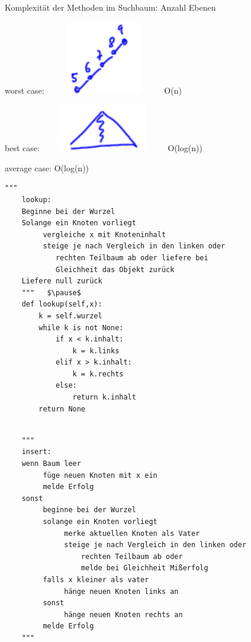 \documentclass{beamer}
\begin{document}
\begin{frame}[fragile]
Komplexität der Methoden im Suchbaum: Anzahl Ebenen  

worst case: ~~~~  
\includegraphics[scale=0.6]{suchbaum6.png}  ~~~~ \pause  O(n)  
 
best case: ~~~~  
\includegraphics[scale=0.6]{suchbaum7.png}  ~~~~  \pause  O(log(n))   

average case: O(log(n))  
\end{frame}

\begin{frame}[fragile]
\begin{lstlisting}[mathescape=true]
    """
    lookup: 
    Beginne bei der Wurzel
    Solange ein Knoten vorliegt
         vergleiche x mit Knoteninhalt
         steige je nach Vergleich in den linken oder
            rechten Teilbaum ab oder liefere bei
            Gleichheit das Objekt zurück
    Liefere null zurück
    """   $\pause$
    def lookup(self,x):
        k = self.wurzel
        while k is not None:
            if x < k.inhalt:
                k = k.links
            elif x > k.inhalt:
                k = k.rechts
            else:
                return k.inhalt
        return None
\end{lstlisting} 
\end{frame}

\begin{frame}[fragile]
\begin{lstlisting}[mathescape=true]
        
    """
    insert:  
    wenn Baum leer 
         füge neuen Knoten mit x ein 
         melde Erfolg
    sonst
         beginne bei der Wurzel
         solange ein Knoten vorliegt
              merke aktuellen Knoten als Vater
              steige je nach Vergleich in den linken oder
                  rechten Teilbaum ab oder
                  melde bei Gleichheit Mißerfolg
         falls x kleiner als vater
              hänge neuen Knoten links an
         sonst 
              hänge neuen Knoten rechts an
         melde Erfolg
    """    
\end{lstlisting}

\end{frame}
\end{document}
